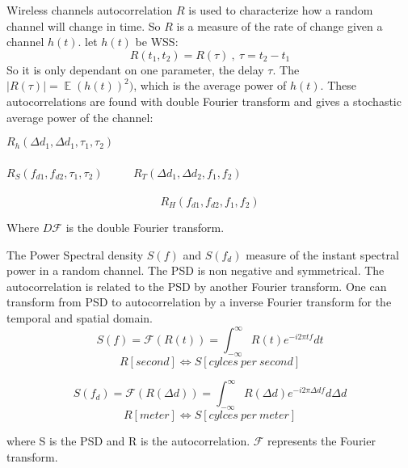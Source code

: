 Wireless channels autocorrelation $R$ is used to characterize how a random channel will change in time. So $R$ is a measure of the rate of change given a channel $h(t)$. let $h(t)$ be WSS:
\begin{equation}
R(t_1,t_2) = R(\tau) \ , \  \tau =t_2 - t_1  
\end{equation}
So it is only dependant on one parameter, the delay $\tau$. The $|R(\tau)| = \mathop{\mathbb{E}}(h(t))^2)$, which is the average power of $h(t)$. These autocorrelations are found with double Fourier transform and gives a stochastic average power of the channel:
\begin{center}
$R_h(\Delta d_1,\Delta d_1,\tau_1,\tau_2)$\\
\\
$R_S(f_{d1},f_{d2},\tau_1,\tau_2)$ $\quad \quad$ $R_T(\Delta d_1,\Delta d_2,f_1,f_2)$\\
\\
\vspace{-1.9em}
\begin{equation}
R_H(f_{d1},f_{d2},f_1,f_2)
\end{equation}
\end{center}
Where $D\mathcal{F}$ is the double Fourier transform.


The Power Spectral density $S(f)$ and $S(f_d)$ measure of the instant spectral power in a random channel. The PSD is non negative and symmetrical. The autocorrelation is related to the PSD by another Fourier transform. One can transform from PSD to autocorrelation by a inverse Fourier transform for the temporal and spatial domain. 
\begin{equation}
S(f) = \mathcal{F}(R(t)) = \int_{- \infty}^{\infty} R(t)e^{-i2 \pi t f} d t
\end{equation}
\begin{equation}
R [second] \Leftrightarrow
S [cylces \ per \ second]
\end{equation}

\begin{equation}
S(f_d) = \mathcal{F}(R(\Delta d )) = \int_{- \infty}^{\infty} R(\Delta d)e^{-i2 \pi \Delta d f} d \Delta d
\end{equation}
\begin{equation}
R [meter] \Leftrightarrow
S [cylces \ per \ meter]
\end{equation}

where S is the PSD and R is the autocorrelation. $\mathcal{F}$ represents the Fourier transform. 

